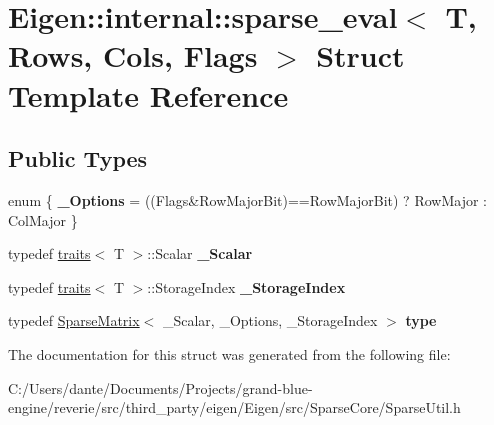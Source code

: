 \hypertarget{struct_eigen_1_1internal_1_1sparse__eval}{}\section{Eigen\+::internal\+::sparse\+\_\+eval$<$ T, Rows, Cols, Flags $>$ Struct Template Reference}
\label{struct_eigen_1_1internal_1_1sparse__eval}
\subsection*{Public Types}
\begin{DoxyCompactItemize}
\item 
\mbox{\label{struct_eigen_1_1internal_1_1sparse__eval_a7db6cdda3af8935c00b699ba84af2642}} 
enum \{ {\bfseries \+\_\+\+Options} = ((Flags\&Row\+Major\+Bit)==Row\+Major\+Bit) ? Row\+Major \+: Col\+Major
 \}
\item 
\mbox{\label{struct_eigen_1_1internal_1_1sparse__eval_aa7ec65e247c09cc782737dd1b917c746}} 
typedef \mbox{\hyperlink{struct_eigen_1_1internal_1_1traits}{traits}}$<$ T $>$\+::Scalar {\bfseries \+\_\+\+Scalar}
\item 
\mbox{\label{struct_eigen_1_1internal_1_1sparse__eval_a83ac96d9391f27e971a99878d9480258}} 
typedef \mbox{\hyperlink{struct_eigen_1_1internal_1_1traits}{traits}}$<$ T $>$\+::Storage\+Index {\bfseries \+\_\+\+Storage\+Index}
\item 
\mbox{\label{struct_eigen_1_1internal_1_1sparse__eval_aff5f6f9f14505af5bbb191f469749a84}} 
typedef \mbox{\hyperlink{class_eigen_1_1_sparse_matrix}{Sparse\+Matrix}}$<$ \+\_\+\+Scalar, \+\_\+\+Options, \+\_\+\+Storage\+Index $>$ {\bfseries type}
\end{DoxyCompactItemize}


The documentation for this struct was generated from the following file\+:\begin{DoxyCompactItemize}
\item 
C\+:/\+Users/dante/\+Documents/\+Projects/grand-\/blue-\/engine/reverie/src/third\+\_\+party/eigen/\+Eigen/src/\+Sparse\+Core/Sparse\+Util.\+h\end{DoxyCompactItemize}
